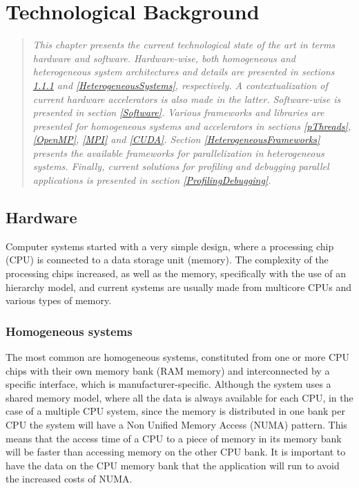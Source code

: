 \chapter{Technological Background}
\label{TechnologicalBackground}

\begin{quote}
\textit{This chapter presents the current technological state of the art in terms hardware and software. Hardware-wise, both homogeneous and heterogeneous system architectures and details are presented in sections \ref{HomogeneousSystems} and \ref{HeterogeneousSystems}, respectively. A contextualization of current hardware accelerators is also made in the latter. Software-wise is presented in section \ref{Software}. Various frameworks and libraries are presented for homogeneous systems and accelerators in sections \ref{pThreads}, \ref{OpenMP}, \ref{MPI} and \ref{CUDA}. Section \ref{HeterogeneousFrameworks} presents the available frameworks for parallelization in heterogeneous systems. Finally, current solutions for profiling and debugging parallel applications is presented in section \ref{ProfilingDebugging}.}
\end{quote}

\section{Hardware}
\label{Hardware}

Computer systems started with a very simple design, where a processing chip (CPU) is connected to a data storage unit (memory). The complexity of the processing chips increased, as well as the memory, specifically with the use of an hierarchy model, and current systems are usually made from multicore CPUs and various types of memory.

\subsection{Homogeneous systems}
\label{HomogeneousSystems}

The most common are homogeneous systems, constituted from one or more CPU chips with their own memory bank (RAM memory) and interconnected by a specific interface, which is manufacturer-specific. Although the system uses a shared memory model, where all the data is always available for each CPU, in the case of a multiple CPU system, since the memory is distributed in one bank per CPU the system will have a Non Unified Memory Access (NUMA) pattern. This means that the access time of a CPU to a piece of memory in its memory bank will be faster than accessing memory on the other CPU bank. It is important to have the data on the CPU memory bank that the application will run to avoid the increased costs of NUMA.

